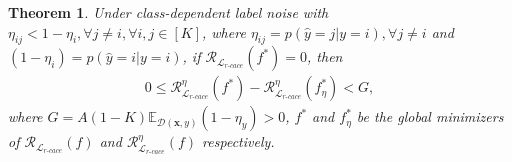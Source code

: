 \documentclass{article}
\newtheorem{theorem}{Theorem}
\begin{document}
\begin{theorem}
	Under class-dependent label noise with $\eta_{ij}<1-\eta_{i},\forall j\ne i,\forall i,j \in [K]$, where $\eta_{ij}=p(\hat{y}=j|y=i), \forall j\ne i$ and $(1-\eta_{i}) = p(\hat{y}=i|y=i)$, if $\mathcal{R}_{\mathcal{L}_{r\text{-}cace}}(f^{*})=0$, then
	\begin{align}
		0\le\mathcal{R}_{\mathcal{L}_{r\text{-}cace}}^{\eta}(f^{*}) - \mathcal{R}_{\mathcal{L}_{r\text{-}cace}}^{\eta}(f^{*}_{\eta}) < G, \nonumber
	\end{align}
	where $G=A(1-K) \mathbb{E}_{\mathcal{D}(\bm{x},y)}(1-\eta_{y}) >0 $, $f^{*}$ and $f^{*}_{\eta}$ be the global minimizers of $\mathcal{R}_{\mathcal{L}_{r\textrm{-}cace}}(f)$ and $\mathcal{R}^{\eta}_{\mathcal{L}_{r\textrm{-}cace}}(f)$ respectively. 
	
\end{theorem}
\end{document}

